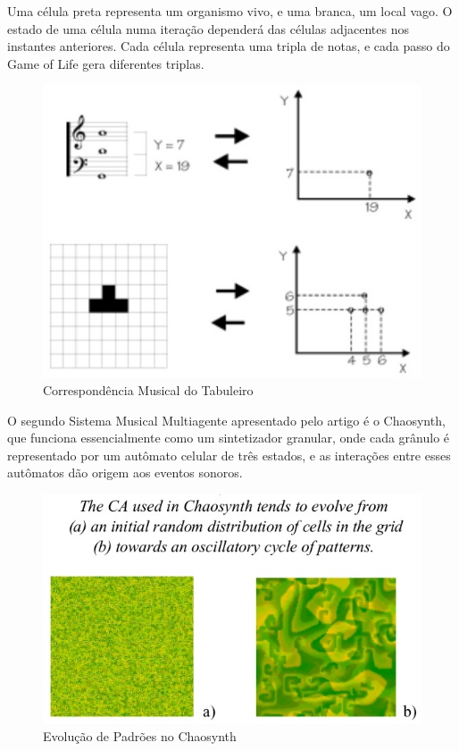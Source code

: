 \documentclass[a4paper, 11pt, twoside]{article}
\begin{document}
\begin{multicols}{2}
Uma célula preta representa um organismo vivo, e uma branca, um local vago. 
O estado de uma célula numa iteração dependerá das células adjacentes nos 
instantes anteriores. Cada célula representa uma tripla de notas, e cada 
passo do Game of Life gera diferentes triplas.

\begin{figure}[H]
  \centering
  \includegraphics[scale=0.52]{gameoflife2.jpg}
  \caption{Correspondência Musical do Tabuleiro~\cite{miranda2003music}}
  \label{fig:game2}

\end{figure}

O segundo Sistema Musical Multiagente apresentado pelo artigo é o Chaosynth, 
que funciona essencialmente como um sintetizador granular, onde cada grânulo é 
representado por um autômato celular de três estados, e as interações 
entre esses autômatos dão origem aos eventos sonoros.

\begin{figure}[H]
  \centering
  \includegraphics[scale=0.52]{chaosynth.jpg}
  \caption{Evolução de Padrões no Chaosynth~\cite{miranda2003music}}
  \label{fig:chaos1}
\end{figure}


\end{multicols}
\end{document}
